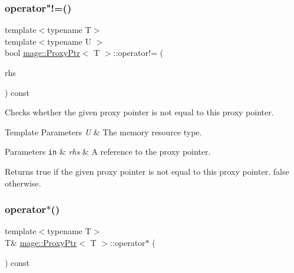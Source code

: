 \subsubsection{\texorpdfstring{operator"!=()}{operator!=()}}
{\footnotesize\ttfamily template$<$typename T$>$ \\
template$<$typename U $>$ \\
bool \hyperlink{classmage_1_1_proxy_ptr}{mage\+::\+Proxy\+Ptr}$<$ T $>$\+::operator!= (\begin{DoxyParamCaption}\item[{const \hyperlink{classmage_1_1_proxy_ptr}{Proxy\+Ptr}$<$ U $>$ \&}]{rhs }\end{DoxyParamCaption}) const\hspace{0.3cm}{\ttfamily [noexcept]}}

Checks whether the given proxy pointer is not equal to this proxy pointer.


\begin{DoxyTemplParams}{Template Parameters}
{\em U} & The memory resource type. \\
\hline
\end{DoxyTemplParams}

\begin{DoxyParams}[1]{Parameters}
\mbox{\tt in}  & {\em rhs} & A reference to the proxy pointer. \\
\hline
\end{DoxyParams}
\begin{DoxyReturn}{Returns}
{\ttfamily true} if the given proxy pointer is not equal to this proxy pointer. {\ttfamily false} otherwise. 
\end{DoxyReturn}
\hypertarget{classmage_1_1_proxy_ptr_aaf7b96ea7e8350ce5f2ae1f504627fd9}{}\label{classmage_1_1_proxy_ptr_aaf7b96ea7e8350ce5f2ae1f504627fd9} 
\subsubsection{\texorpdfstring{operator$\ast$()}{operator*()}}
{\footnotesize\ttfamily template$<$typename T$>$ \\
T\& \hyperlink{classmage_1_1_proxy_ptr}{mage\+::\+Proxy\+Ptr}$<$ T $>$\+::operator$\ast$ (\begin{DoxyParamCaption}{ }\end{DoxyParamCaption}) const\hspace{0.3cm}{\ttfamily [noexcept]}}

